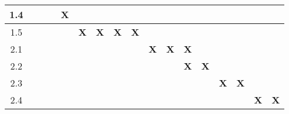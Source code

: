 \begin{table}[htb!]
\begin{tabular}{c|c|c|c|c|c|c|c|c|c|c|c|c|c|c|c|c|}
\multicolumn{1}{|c|}{1.4}             &                       &                       &                       & {\bf X}               &                       &                       &                       &                       &                       &                       &                 &                 &                 &                 &                 &                 \\ \hline
\multicolumn{1}{|c|}{1.5}             &                       &                       &                       &                       & {\bf X}               & {\bf X}               & {\bf X}               & {\bf X}               &                       &                       &                 &                 &                 &                 &                 &                 \\ \hline
\multicolumn{1}{|c|}{2.1}             &                       &                       &                       &                       &                       &                       &                       &                       & {\bf X}               & {\bf X}               & {\bf X}         &                 &                 &                 &                 &                 \\ \hline
\multicolumn{1}{|c|}{2.2}             &                       &                       &                       &                       &                       &                       &                       &                       &                       &                       & {\bf X}         & {\bf X}         &                 &                 &                 &                 \\ \hline
\multicolumn{1}{|c|}{2.3}             &                       &                       &                       &                       &                       &                       &                       &                       &                       &                       &                 &                 & {\bf X}         & {\bf X}         &                 &                 \\ \hline
\multicolumn{1}{|c|}{2.4}             &                       &                       &                       &                       &                       &                       &                       &                       &                       &                       &                 &                 &                 &                 & {\bf X}         & {\bf X}         \\ \hline
\end{tabular}
\end{table}

